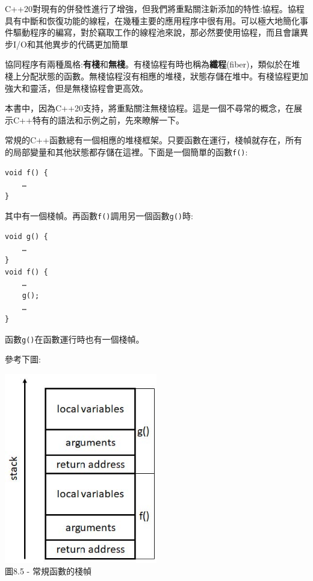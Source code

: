 
C++20對現有的併發性進行了增強，但我們將重點關注新添加的特性:協程。協程具有中斷和恢復功能的線程，在幾種主要的應用程序中很有用。可以極大地簡化事件驅動程序的編寫，對於竊取工作的線程池來說，那必然要使用協程，而且會讓異步I/O和其他異步的代碼更加簡單


協同程序有兩種風格:\textbf{有棧}和\textbf{無棧}。有棧協程有時也稱為\textbf{纖程}(fiber)，類似於在堆棧上分配狀態的函數。無棧協程沒有相應的堆棧，狀態存儲在堆中。有棧協程更加強大和靈活，但是無棧協程會更高效。

本書中，因為C++20支持，將重點關注無棧協程。這是一個不尋常的概念，在展示C++特有的語法和示例之前，先來瞭解一下。

常規的C++函數總有一個相應的堆棧框架。只要函數在運行，棧幀就存在，所有的局部變量和其他狀態都存儲在這裡。下面是一個簡單的函數\texttt{f()}:

\begin{lstlisting}[style=styleCXX]
void f() {
	…
}
\end{lstlisting}

其中有一個棧幀。再函數\texttt{f()}調用另一個函數\texttt{g()}時:

\begin{lstlisting}[style=styleCXX]
void g() {
	…
}
void f() {
	…
	g();
	…
}
\end{lstlisting}

函數\texttt{g()}在函數運行時也有一個棧幀。 

參考下圖:

\begin{center}
\includegraphics[width=0.5\textwidth]{content/2/chapter8/images/5.jpg}\\
圖8.5 - 常規函數的棧幀
\end{center}

